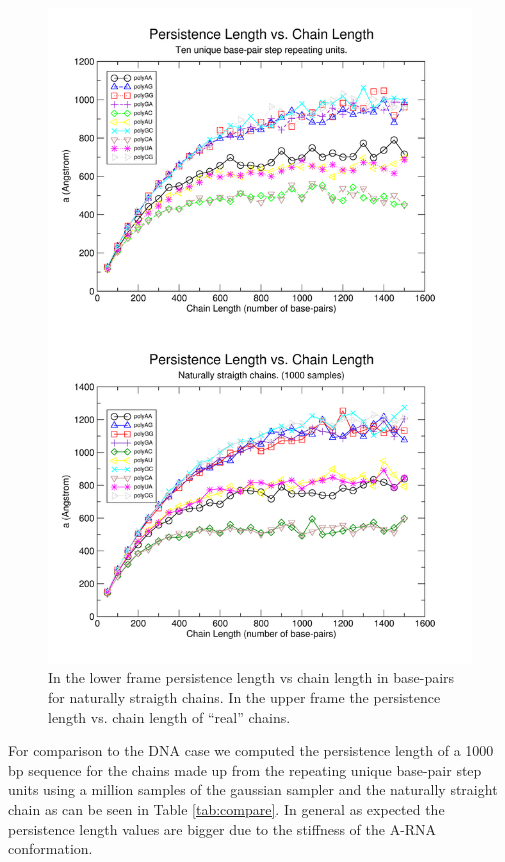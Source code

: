 \begin{figure}
\centering
\includegraphics[angle=0, scale=2.8]{Chapter4/perVlen.png}
\caption{In the lower frame persistence length vs chain length in
  base-pairs for naturally straigth chains. In the upper frame the
  persistence length vs. chain length of ``real'' chains.}
\label{fig:perVlen}
\end{figure}

For comparison to the DNA case we computed the persistence length of a
1000 bp sequence for the chains made up from the repeating unique
base-pair step units using a million samples of the gaussian sampler
and the naturally straight chain as can be seen in Table
\ref{tab:compare}. In general as expected the persistence length
values are bigger due to the stiffness of the A-RNA conformation.

